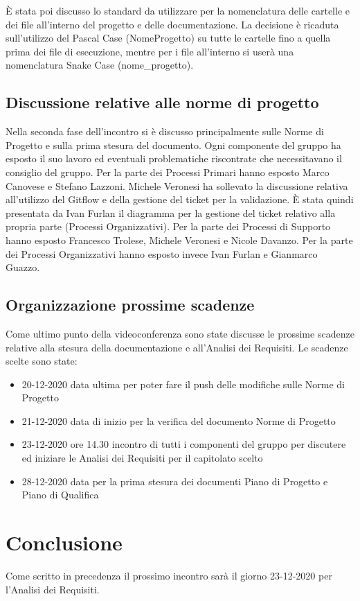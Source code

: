 È stata poi discusso lo standard da utilizzare per la nomenclatura delle cartelle e dei file all'interno del progetto e delle documentazione. La decisione è ricaduta sull'utilizzo del Pascal Case (NomeProgetto) su tutte le cartelle fino a quella prima dei file di esecuzione, mentre per i file all'interno si userà una nomenclatura Snake Case (nome\_progetto).

\subsection{Discussione relative alle norme di progetto}
Nella seconda fase dell'incontro si è discusso principalmente sulle Norme di Progetto e sulla prima stesura del documento. Ogni componente del gruppo ha esposto il suo lavoro ed eventuali problematiche riscontrate che necessitavano il consiglio del gruppo. Per la parte dei Processi Primari hanno esposto Marco Canovese e Stefano Lazzoni. Michele Veronesi ha sollevato la discussione relativa all'utilizzo del Gitflow e della gestione del ticket per la validazione. È stata quindi presentata da Ivan Furlan il diagramma per la gestione del ticket relativo alla propria parte (Processi Organizzativi). Per la parte dei Processi di Supporto hanno esposto Francesco Trolese, Michele Veronesi e Nicole Davanzo. Per la parte dei Processi Organizzativi hanno esposto invece Ivan Furlan e Gianmarco Guazzo.

\subsection{Organizzazione prossime scadenze}
Come ultimo punto della videoconferenza sono state discusse le prossime scadenze relative alla stesura della documentazione e all'Analisi dei Requisiti. Le scadenze scelte sono state:
\begin{itemize}
	\item 20-12-2020 data ultima per poter fare il push delle modifiche sulle Norme di Progetto
	\item 21-12-2020 data di inizio per la verifica del documento Norme di Progetto 
	\item 23-12-2020 ore 14.30 incontro di tutti i componenti del gruppo per discutere ed iniziare le Analisi dei Requisiti per il capitolato scelto
	\item 28-12-2020 data per la prima stesura dei documenti Piano di Progetto e Piano di Qualifica
\end{itemize}

\section{Conclusione}
Come scritto in precedenza il prossimo incontro sarà il giorno 23-12-2020 per l'Analisi dei Requisiti.

